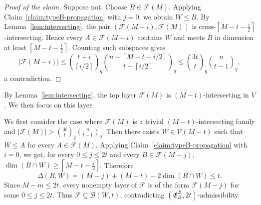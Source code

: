 \documentclass[11pt]{article}
\theoremstyle{definition}
\newenvironment{poc}{\begin{proof}[Proof of the claim]\renewcommand*{\qedsymbol}{$\blacksquare$}}{\end{proof}}
\newcommand{\qbinom}[2]{\genfrac{(}{)}{0pt}{}{#1}{#2}_q}
\begin{document}
\begin{poc}
Suppose not. 
Choose $B\in\mathcal F(M)$. 
Applying Claim~\ref{claim:typeB-propagation} with $j=0$, we obtain $W\le B$. 
By Lemma~\ref{lem:intersecting}, the pair $(\mathcal F(M-i),\mathcal F(M))$ is cross-$\left\lceil M-t-\frac{i}{2}\right\rceil$-intersecting. Hence every $A\in\mathcal F(M-i)$ contains $W$ and meets $B$ in dimension at least $\left\lceil M-t-\frac{i}{2}\right\rceil$.
Counting such subspaces gives
\[
|\mathcal F(M-i)|
\le
\qbinom{t+i}{\left\lceil i/2\right\rceil}
\qbinom{n-\left\lceil M-t-i/2\right\rceil}{t-\left\lceil i/2\right\rceil}
\le
\qbinom{3t}{t}\qbinom{n}{t-1},
\]
a contradiction.
\end{poc}

By Lemma~\ref{lem:intersecting}, the top layer $\mathcal F(M)$ is $(M-t)$-intersecting in $V$. We then focus on this layer.

We first consider the case where $\mathcal F(M)$ is a trivial $(M-t)$-intersecting family and
\(
|\mathcal F(M)|>\qbinom{3t}{t}\qbinom{n}{t-1}.
\)
Then there exists \(W\in\mathcal V(M-t)\) such that \(W\le A\) for every \(A\in\mathcal F(M)\). Applying Claim~\ref{claim:typeB-propagation} with \(i=0\), we get, for every $0\le j\le 2t$ and every $B\in\mathcal F(M-j)$,
\(
\dim(B\cap W)\ge \left\lceil M-t-\frac{j}{2}\right\rceil.
\)
Therefore
\[
\Delta(B,W)
=
(M-j)+(M-t)-2\dim(B\cap W)
\le t.
\]
Since $M-m\le 2t$, every nonempty layer of $\mathcal F$ is of the form $\mathcal F(M-j)$ for some $0\le j\le 2t$. 
Thus $\mathcal F\subseteq \mathcal B(W,t)$, contradicting $(\mathfrak E_B^{\mathrm{2t}},2t)$-admissibility.
\end{document}
